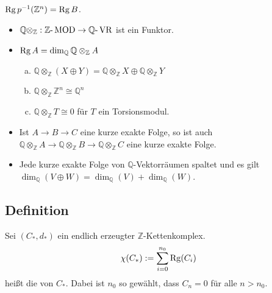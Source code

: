 $\operatorname{Rg} p ^{-1}(\mathbb{Z}^n) = \operatorname{Rg} B$. \bewende
{}
\begin{itemize}
	\item $\mathbb{Q} \otimes_{\mathbb{Z}} : \mathbb{Z}\text{-}\operatorname{MOD} \to \mathbb{Q}\text{-}\operatorname{VR} $ ist ein Funktor.
	\item $\operatorname{Rg} A= \dim_{\mathbb{Q}} \mathbb{Q} \otimes_{\mathbb{Z}} A$
	\begin{enumerate}[(a)]
		\item $\mathds{Q} \otimes_\mathds{Z} (X \oplus Y) = \mathds{Q} \otimes_\mathds{Z} X \oplus  \mathds{Q} \otimes_\mathds{Z} Y$
		\item $\mathds{Q} \otimes_\mathds{Z} \mathds{Z}^n \cong \mathds{Q}^n$
		\item $\mathds{Q} \otimes_\mathds{Z} T \cong 0$ für $T$ ein Torsionsmodul.
	\end{enumerate}
	\item Ist $A \to B \to C$ eine kurze exakte Folge, so ist auch 
	$\mathds{Q} \otimes_\mathds{Z} A \to \mathds{Q} \otimes_\mathds{Z} B \to \mathds{Q} \otimes_\mathds{Z} C$ eine kurze exakte Folge.
	\item Jede kurze exakte Folge von $\mathds{Q}$-Vektorräumen spaltet und es gilt $\dim_\mathds{Q}(V \oplus W) = \dim_\mathds{Q}(V)+ \dim_\mathds{Q} (W)$.
\end{itemize}

\subsection[Definition: Eulercharakteristik von $\mathds{Z}$-Kettenkomplexen]{Definition} %
\label{sub:49}
Sei $(C_*,d_*)$ ein endlich erzeugter $\mathds{Z}$-Kettenkomplex.
\[
	\chi(C_*) := \sum_{i=0}^{n_0} \operatorname{Rg}(C_i) 
\]
heißt die  von $C_*$. Dabei ist $n_0$ so gewählt, dass $C_n =0$ für alle $n >n_0$. 

